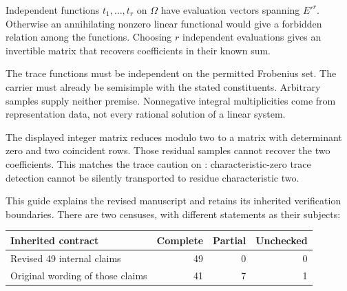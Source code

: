 
Independent functions $t_1,\ldots,t_r$ on $\Omega$ have evaluation vectors spanning $E'^r$. Otherwise an annihilating nonzero linear functional would give a forbidden relation among the functions. Choosing $r$ independent evaluations gives an invertible matrix that recovers coefficients in their known sum.

The trace functions must be independent on the permitted Frobenius set. The carrier must already be semisimple with the stated constituents. Arbitrary samples supply neither premise. Nonnegative integral multiplicities come from representation data, not every rational solution of a linear system.

The displayed integer matrix reduces modulo two to a matrix with determinant zero and two coincident rows. Those residual samples cannot recover the two coefficients. This matches the trace caution on : characteristic-zero trace detection cannot be silently transported to residue characteristic two.


This guide explains the revised manuscript and retains its inherited verification boundaries. There are two censuses, with different statements as their subjects:

\begin{center}
\begin{tabular}{@{}lrrr@{}}\toprule
Inherited contract & Complete & Partial & Unchecked\\\midrule
Revised 49 internal claims & 49 & 0 & 0\\
Original wording of those claims & 41 & 7 & 1\\\bottomrule
\end{tabular}
\end{center}

